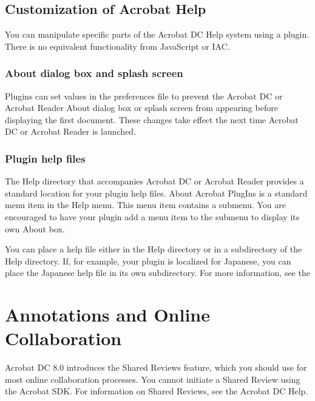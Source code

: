 \documentclass[letterpaper,12pt,english,openany,oneside]{sphinxmanual}
\begin{document}
\section{Customization of Acrobat Help}
\label{\detokenize{Overview_UserInterface:customization-of-acrobat-help}}
You can manipulate specific parts of the Acrobat DC Help system using a plug\sphinxhyphen{}in. There is no equivalent functionality from JavaScript or IAC.


\subsection{About dialog box and splash screen}
\label{\detokenize{Overview_UserInterface:about-dialog-box-and-splash-screen}}
Plug\sphinxhyphen{}ins can set values in the preferences file to prevent the Acrobat DC or Acrobat Reader About dialog box or splash screen from appearing before displaying the first document. These changes take effect the next time Acrobat DC or Acrobat Reader is launched.




\subsection{Plug\sphinxhyphen{}in help files}
\label{\detokenize{Overview_UserInterface:plug-in-help-files}}
The Help directory that accompanies Acrobat DC or Acrobat Reader provides a standard location for your plug\sphinxhyphen{}in help files. About Acrobat Plug\sphinxhyphen{}Ins is a standard menu item in the Help menu. This menu item contains a submenu. You are encouraged to have your plug\sphinxhyphen{}in add a menu item to the submenu to display its own About box.

You can place a help file either in the Help directory or in a subdirectory of the Help directory. If, for example, your plug\sphinxhyphen{}in is localized for Japanese, you can place the Japanese help file in its own subdirectory. For more information, see the 


\chapter{Annotations and Online Collaboration}
\label{\detokenize{Overview_CustomWorkflows:annotations-and-online-collaboration}}\label{\detokenize{Overview_CustomWorkflows::doc}}
Acrobat DC 8.0 introduces the Shared Reviews feature, which you should use for most online collaboration processes. You cannot initiate a Shared Review using the Acrobat SDK. For information on Shared Reviews, see the Acrobat DC Help.
\end{document}
